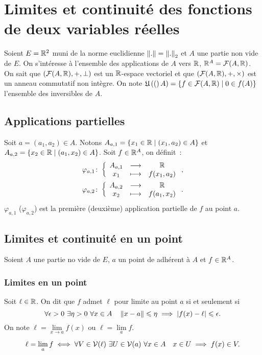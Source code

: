 \section{Limites et continuité des fonctions de deux variables réelles}

Soient \(E=\mathbb{R}^2\) muni de la norme euclidienne \(\left\lVert.\right\rVert=\left\lVert.\right\rVert_2\) et \(A\) une partie non vide de \(E\). On s'intéresse à l'ensemble des applications de \(A\) vers \(\mathbb{R}\), \(\mathbb{R}^A=\mathcal{F}(A, \mathbb{R})\). On sait que \((\mathcal{F}(A, \mathbb{R}), +, \perp)\) est un \(\mathbb{R}\)-espace vectoriel et que \((\mathcal{F}(A, \mathbb{R}), +, \times)\) est un anneau commutatif non intègre. On note \(\mathfrak{U}\left((\right)A)=\left\{f \in \mathcal{F}(A, \mathbb{R})\mathrel{}\middle|\mathrel{}0 \in f(A)\right\}\) l'ensemble des inversibles de \(A\).

\subsection{Applications partielles}

Soit \(a=(a_1, a_2) \in A\). Notons \(A_{a, 1}=\left\{x_1 \in \mathbb{R}\mathrel{}\middle|\mathrel{}(x_1, a_2) \in A\right\}\) et \(A_{a, 2}=\left\{x_2 \in \mathbb{R}\mathrel{}\middle|\mathrel{}(a_1, x_2) \in A\right\}\). Soit \(f \in \mathbb{R}^A\), on définit~:
\begin{gather}
  \varphi_{a, 1}\colon \left\{\begin{array}{ccc} A_{a, 1} & \longrightarrow &\mathbb{R}\\ x_1 & \longmapsto & f(x_1, a_2) \end{array} \right., \\ \varphi_{a, 2}\colon \left\{\begin{array}{ccc} A_{a, 2} & \longrightarrow &\mathbb{R}\\ x_2 & \longmapsto & f(a_1, x_2) \end{array} \right..
\end{gather}
\(\varphi_{a, 1}\) (\(\varphi_{a, 2}\)) est la première (deuxième) application partielle de \(f\) au point \(a\).

\subsection{Limites et continuité en un point}

Soient \(A\) une partie no vide de \(E\), \(a\) un point de adhérent à \(A\) et \(f \in \mathbb{R}^A\).

\subsubsection{Limites en un point}

\begin{defdef}
  Soit \(\ell \in \mathbb{R}\). On dit que \(f\) admet \(\ell\) pour limite au point \(a\) si et seulement si
  \begin{equation}
    \forall \epsilon>0 \ \exists \eta>0 \ \forall x \in A \quad \norme{x-a} \leqslant \eta \implies \abs{f(x)-\ell} \leqslant \epsilon.
  \end{equation}
  On note \(\ell = \lim\limits_{x \to a} f(x)\) ou \(\ell=\lim\limits_{a}f\).
\end{defdef}
\begin{defdef}
  \begin{equation}
    \ell=\lim\limits_{a}f \iff \forall V \in \mathcal{V}(\ell) \ \exists U \in \mathcal{V}(a) \ \forall x \in A \quad x \in U \implies f(x) \in V.
  \end{equation}
\end{defdef}

